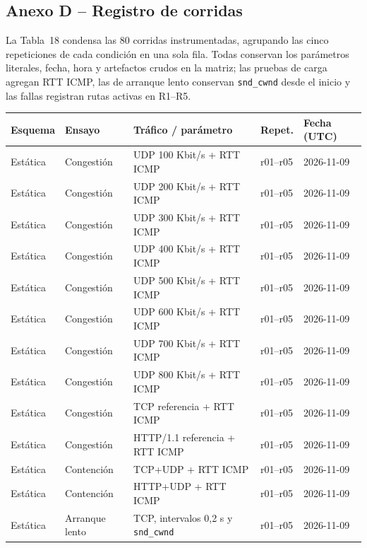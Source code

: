 \documentclass[11pt,a4paper]{article}
\begin{document}
\subsection*{Anexo D -- Registro de corridas}

La Tabla~18 condensa las 80 corridas instrumentadas, agrupando las cinco repeticiones de cada condici\'on en una sola fila. Todas conservan los par\'ametros literales, fecha, hora y artefactos crudos en la matriz; las pruebas de carga agregan RTT ICMP, las de arranque lento conservan \texttt{snd\_cwnd} desde el inicio y las fallas registran rutas activas en R1--R5.

\needspace{1cm}
\begin{center}
\begin{minipage}{0.96\linewidth}
\centering
\small
\setlength{\tabcolsep}{4pt}
\begin{tabular}{@{}p{1.7cm}p{2.1cm}p{5.1cm}p{1.6cm}p{2.1cm}@{}}
\toprule
\textbf{Esquema} & \textbf{Ensayo} & \textbf{Tr\'afico / par\'ametro} & \textbf{Repet.} & \textbf{Fecha (UTC)} \\
\midrule
Est\'atica & Congesti\'on & UDP 100 Kbit/s + RTT ICMP & r01--r05 & 2026-11-09 \\
Est\'atica & Congesti\'on & UDP 200 Kbit/s + RTT ICMP & r01--r05 & 2026-11-09 \\
Est\'atica & Congesti\'on & UDP 300 Kbit/s + RTT ICMP & r01--r05 & 2026-11-09 \\
Est\'atica & Congesti\'on & UDP 400 Kbit/s + RTT ICMP & r01--r05 & 2026-11-09 \\
Est\'atica & Congesti\'on & UDP 500 Kbit/s + RTT ICMP & r01--r05 & 2026-11-09 \\
Est\'atica & Congesti\'on & UDP 600 Kbit/s + RTT ICMP & r01--r05 & 2026-11-09 \\
Est\'atica & Congesti\'on & UDP 700 Kbit/s + RTT ICMP & r01--r05 & 2026-11-09 \\
Est\'atica & Congesti\'on & UDP 800 Kbit/s + RTT ICMP & r01--r05 & 2026-11-09 \\
Est\'atica & Congesti\'on & TCP referencia + RTT ICMP & r01--r05 & 2026-11-09 \\
Est\'atica & Congesti\'on & HTTP/1.1 referencia + RTT ICMP & r01--r05 & 2026-11-09 \\
Est\'atica & Contenci\'on & TCP+UDP + RTT ICMP & r01--r05 & 2026-11-09 \\
Est\'atica & Contenci\'on & HTTP+UDP + RTT ICMP & r01--r05 & 2026-11-09 \\
Est\'atica & Arranque lento & TCP, intervalos 0,2 s y \texttt{snd\_cwnd} & r01--r05 & 2026-11-09 \\

\end{tabular}
\end{minipage}
\end{center}
\end{document}
